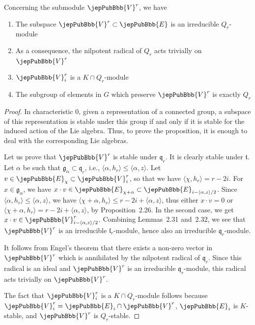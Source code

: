 Concerning the submodule $\jepPubBbb{V}^r$, we have
\begin{proposition}
\begin{enumerate}[label=(\arabic*)]
\item The subspace $\jepPubBbb{V}^r\subset\jepPubBbb{E}$ is an irreducible $Q_r$-module
\item As a consequence, the nilpotent radical of $Q_r$ acts trivially on $\jepPubBbb{V}^r$
\item $\jepPubBbb{V}^r_i$ is a $K\cap Q_r$-module
\item The subgroup of elements in $G$ which preserve $\jepPubBbb{V}^r$ is exactly $Q_r$
\end{enumerate}
\end{proposition}
\begin{proof}
In characteristic $0$, given a representation of a connected group, a subspace of this representation is stable under this group if and only if it is stable for the induced action of the Lie algebra. Thus, to prove the proposition, it is enough to deal with the corresponding Lie algebras.

Let us prove that $\jepPubBbb{V}^r$ is stable under $\mathfrak q_r$. It is clearly stable under $\mathfrak t$. Let $\alpha$ be such that $\mathfrak g_\alpha\subset\mathfrak q_r$, i.e., $\langle\alpha,h_r\rangle\leqslant\langle\alpha,z\rangle$. Let $v\in\jepPubBbb{E}_\chi\subset\jepPubBbb{V}^r_i$, so that we have $\langle\chi,h_r\rangle=r-2i$. For $x\in\mathfrak g_\alpha$, we have $x\cdot v\in\jepPubBbb{E}_{\chi+\alpha}\subset\jepPubBbb{E}_{i-\langle\alpha,z\rangle/2}$. Since $\langle\alpha,h_r\rangle\leqslant\langle\alpha,z\rangle$, we have $\langle\chi+\alpha,h_r\rangle\leqslant r-2i+\langle\alpha,z\rangle$, thus either $x\cdot v=0$ or $\langle\chi+\alpha,h_r\rangle=r-2i+\langle\alpha,z\rangle$, by Proposition~2.26. In the second case, we get $x\cdot v\in\jepPubBbb{V}^r_{i-\langle\alpha,z\rangle/2}$. Combining Lemmas~2.31 and~2.32, we see that $\jepPubBbb{V}^r$ is an irreducible $\mathfrak l_r$-module, hence also an irreducible $\mathfrak q_r$-module.

It follows from Engel’s theorem that there exists a non-zero vector in $\jepPubBbb{V}^r$ which is annihilated by the nilpotent radical of $\mathfrak q_r$. Since this radical is an ideal and $\jepPubBbb{V}^r$ is an irreducible $\mathfrak q_r$-module, this radical acts trivially on $\jepPubBbb{V}^r$.

The fact that $\jepPubBbb{V}^r_i$ is a $K\cap Q_r$-module follows because $\jepPubBbb{V}^r_i=\jepPubBbb{E}_i\cap\jepPubBbb{V}^r$, $\jepPubBbb{E}_i$ is $K$-stable, and $\jepPubBbb{V}^r$ is $Q_r$-stable.


\end{proof}

